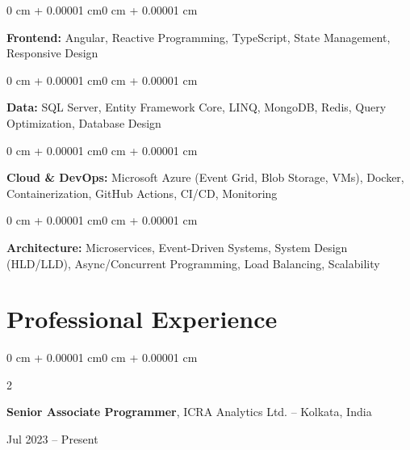 \documentclass[10pt, letterpaper]{article}
\newenvironment{onecolentry}{
    \begin{adjustwidth}{0 cm + 0.00001 cm}{0 cm + 0.00001 cm}
}{
    \end{adjustwidth}
}
\newenvironment{twocolentry}[2][]{
    \onecolentry
    \def\secondColumn{#2}
    \setcolumnwidth{\fill, 4.5 cm}
    \begin{paracol}{2}
}{
    \switchcolumn \raggedleft \secondColumn
    \end{paracol}
    \endonecolentry
}
\begin{document}
\vspace{0.008cm}

\begin{onecolentry}
    \textbf{Frontend:} Angular, Reactive Programming, TypeScript, State Management, Responsive Design
\end{onecolentry}

\vspace{0.008cm}

\begin{onecolentry}
    \textbf{Data:} SQL Server, Entity Framework Core, LINQ, MongoDB, Redis, Query Optimization, Database Design
\end{onecolentry}

\vspace{0.008cm}

\begin{onecolentry}
    \textbf{Cloud \& DevOps:} Microsoft Azure (Event Grid, Blob Storage, VMs), Docker, Containerization, GitHub Actions, CI/CD, Monitoring
\end{onecolentry}

\vspace{0.008cm}

\begin{onecolentry}
    \textbf{Architecture:} Microservices, Event-Driven Systems, System Design (HLD/LLD), Async/Concurrent Programming, Load Balancing, Scalability
\end{onecolentry}

\vspace{0.04 cm}

\section{Professional Experience}

\begin{twocolentry}{Jul 2023 – Present}
    \textbf{Senior Associate Programmer}, ICRA Analytics Ltd. -- Kolkata, India
\end{twocolentry}
\end{document}
